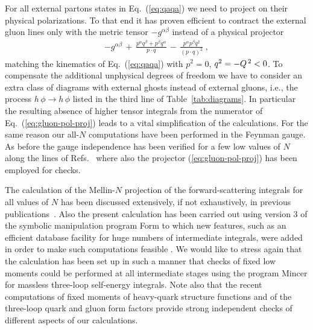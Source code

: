 \documentclass[12pt]{article}
\newcommand{\ra}{\rightarrow}
\begin{document}
For all external partons states in Eq.~(\ref{eq:qaqa}) we need to project on 
their physical polarizations. To that end it has proven efficient to contract 
the external gluon lines only with the metric tensor $-g^{\alpha\beta}$ 
instead of a physical projector
%
\begin{eqnarray}
  \label{eq:gluon-pol-proj}
  -g^{\alpha\beta} 
  \, + \, \frac{p^\alpha q^\beta + p^\beta q^\alpha}{p \cdot q} 
  \, - \, \frac{p^\alpha p^\beta q^2}{(p \cdot q)^2}
  \; ,
\end{eqnarray}
%
matching the kinematics of Eq.~(\ref{eq:qaqa}) with $p^2 = 0$, $q^2= - {Q^{\, 2}} < 0$.
To compensate the additional unphysical degrees of freedom we have to consider 
an extra class of diagrams with external ghosts instead of external gluons, 
i.e., the process $h\,\phi \ra h\,\phi$ listed in the third line of
Table~\ref{tab:diagrams}. In particular the resulting absence of higher tensor 
integrals from the numerator of Eq.~(\ref{eq:gluon-pol-proj}) leads to a 
vital simplification of the calculations. For the same reason our all-$N$
computations have been performed in the Feynman gauge. As before 
the gauge independence has been verified for a few low values of $N$ along the
lines of Refs.~\cite{Mom3loop} where also the projector 
(\ref{eq:gluon-pol-proj}) has been employed for checks.

The calculation of the Mellin-$N$ projection of the forward-scattering 
integrals for all values of $N$ has been discussed extensively, if not 
exhaustively, in previous publications~\cite{Moch:1999eb,MVV2,MVV3,MVV4,MVV6}.
Also the present calculation has been carried out using version 3 of the
symbolic manipulation program {\sc Form} \cite{Vermaseren:2000nd} to which new 
features, such as an efficient database facility for huge numbers of 
intermediate integrals, were added in order to make such computations feasible
\cite{Vermaseren:2002rp}. We would like to stress again that the calculation
has been set up in such a manner that checks of fixed low moments could be 
performed at all intermediate stages using the program {\sc Mincer} 
\cite{Gorishnii:1989gt,Larin:1991fz} for massless three-loop self-energy 
integrals. Note also that the recent computations of fixed moments of 
heavy-quark structure functions \cite{Bierenbaum:2009mv} and of the three-loop 
quark and gluon form factors \cite{FF3loop} provide strong independent checks 
of different aspects of our calculations. 
\end{document}
